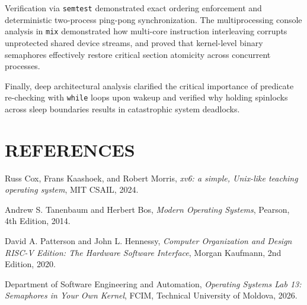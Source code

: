 \documentclass[12pt,a4paper]{report}
\numberwithin{equation}{chapter}
\numberwithin{figure}{chapter}
\numberwithin{table}{chapter}
\begin{document}
Verification via \texttt{semtest} demonstrated exact ordering enforcement and deterministic two-process ping-pong synchronization. The multiprocessing console analysis in \texttt{mix} demonstrated how multi-core instruction interleaving corrupts unprotected shared device streams, and proved that kernel-level binary semaphores effectively restore critical section atomicity across concurrent processes.

Finally, deep architectural analysis clarified the critical importance of predicate re-checking with \texttt{while} loops upon wakeup and verified why holding spinlocks across sleep boundaries results in catastrophic system deadlocks.

\chapter*{REFERENCES}

\noindent [1] Russ Cox, Frans Kaashoek, and Robert Morris, \textit{xv6: a simple, Unix-like teaching operating system}, MIT CSAIL, 2024.

\noindent [2] Andrew S. Tanenbaum and Herbert Bos, \textit{Modern Operating Systems}, Pearson, 4th Edition, 2014.

\noindent [3] David A. Patterson and John L. Hennessy, \textit{Computer Organization and Design RISC-V Edition: The Hardware Software Interface}, Morgan Kaufmann, 2nd Edition, 2020.

\noindent [4] Department of Software Engineering and Automation, \textit{Operating Systems Lab 13: Semaphores in Your Own Kernel}, FCIM, Technical University of Moldova, 2026.
\end{document}
